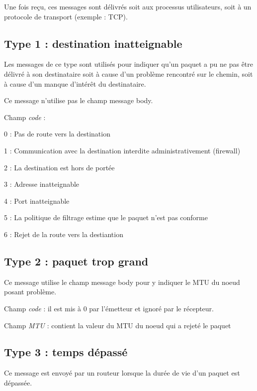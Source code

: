 Une fois reçu, ces messages sont délivrés soit aux processus utilisateurs, soit à un protocole de transport (exemple : TCP).

\subsection{Type 1 : destination inatteignable}

Les messages de ce type sont utilisés pour indiquer qu'un paquet a pu ne pas être délivré à son destinataire soit à cause d'un problème rencontré sur le chemin, soit à cause d'un manque d'intérêt du destinataire.

Ce message n'utilise pas le champ message body.
\medskip

Champ \emph{code} :
    \begin{list}{}{}
    	\item 0 : Pas de route vers la destination 
        \item 1 : Communication avec la destination interdite administrativement (firewall)
        \item 2 : La destination est hors de portée   
        \item 3 : Adresse inatteignable
        \item 4 : Port inatteignable 
        \item 5 : La politique de filtrage estime que le paquet n'est pas conforme
        \item 6 : Rejet de la route vers la destiantion
    \end{list}

\subsection{Type 2 : paquet trop grand}

Ce message utilise le champ message body pour y indiquer le MTU du noeud posant problème.
\medskip

Champ \emph{code} : il est mis à 0 par l'émetteur et ignoré par le récepteur.

Champ \emph{MTU} : contient la valeur du MTU du noeud qui a rejeté le paquet        

\subsection{Type 3 : temps dépassé}

Ce message est envoyé par un routeur lorsque la durée de vie d'un paquet est dépassée. 

